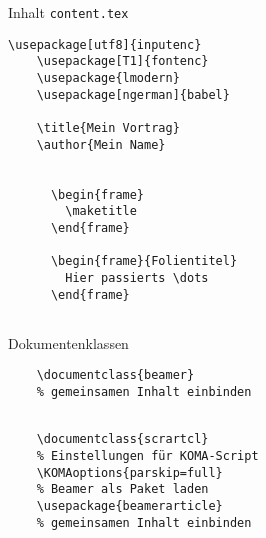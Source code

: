\begin{Frame}[fragile]{Inhalt \texttt{content.tex}}
  \begin{lstlisting}[gobble=4]
    \usepackage[utf8]{inputenc}
    \usepackage[T1]{fontenc}
    \usepackage{lmodern}
    \usepackage[ngerman]{babel}

    \title{Mein Vortrag}
    \author{Mein Name}

    
      \begin{frame}
        \maketitle
      \end{frame}

      \begin{frame}{Folientitel}
        Hier passierts \dots
      \end{frame}
    
  \end{lstlisting}
\end{Frame}

\begin{Frame}[fragile]{Dokumentenklassen}
  \begin{lstlisting}[gobble=4]
    % Beamer als Dokumentenklasse verwenden
    \documentclass{beamer}
    % gemeinsamen Inhalt einbinden
    
  \end{lstlisting}

  \xxx

  \begin{lstlisting}[gobble=4]
    % KOMA-Script als Dokumentenklasse verwenden
    \documentclass{scrartcl}
    % Einstellungen für KOMA-Script
    \KOMAoptions{parskip=full}
    % Beamer als Paket laden
    \usepackage{beamerarticle}
    % gemeinsamen Inhalt einbinden
    
  \end{lstlisting}
\end{Frame}

